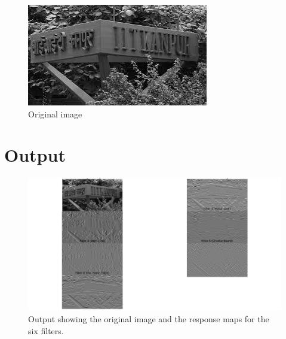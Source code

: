 \documentclass[12pt]{article}
\begin{document}
\begin{figure}[h!]
    \centering
    \includegraphics[width=\textwidth]{iitk_0bcd2f00-d737-4e46-9e60-01ffffe1ea81.png}
    \caption{Original image}
    \label{fig:output}
\end{figure}
\section{Output}

\begin{figure}[h!]
    \centering
    \includegraphics[width=\textwidth]{Figure_1.png}
    \caption{Output showing the original image and the response maps for the six filters.}
    \label{fig:output}
\end{figure}
\end{document}
